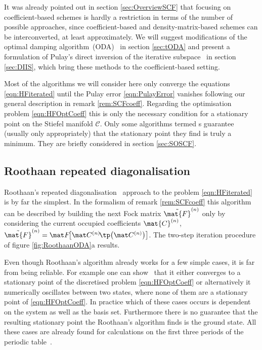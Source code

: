 It was already pointed out in section \vref{sec:OverviewSCF}
that focusing on coefficient-based schemes
is hardly a restriction in terms of the number of possible approaches,
since coefficient-based and density-matrix-based schemes can be interconverted,
at least approximately.
We will suggest modifications of the
optimal damping algorithm~(ODA)~\cite{Cances2000a} in section \ref{sec:tODA}
and present a formulation of Pulay's
direct inversion of the iterative subspace~\cite{Pulay1982}
in section \ref{sec:DIIS},
which bring these methods to the coefficient-based setting.

Most of the \SCF algorithms we will consider here
only converge the \HF equations \eqref{eqn:HFiterated}
until the Pulay error \eqref{eqn:PulayError} vanishes
following our general description in remark \vref{rem:SCFcoeff}.
Regarding the \HF optimisation problem \eqref{eqn:HFOptCoeff}
this is only the necessary condition for a stationary point on the Stiefel
manifold $\mathcal{C}$.
Only some \SCF algorithms
termed s
guarantee (usually only appropriately)
that the stationary point they find is truly a minimum.
They are briefly considered in section \ref{sec:SOSCF}.

\subsection{Roothaan repeated diagonalisation}
\label{sec:RoothaanRepeatedDiag}

Roothaan's repeated diagonalisation~\cite{Roothaan1951}
approach to the \HF problem \eqref{eqn:HFiterated} is by far the simplest.
In the formalism of remark \vref{rem:SCFcoeff}
this algorithm can be described by building the next Fock matrix
$\tilde{\mat{F}}^{(n)}$ only by considering
the current occupied coefficients $\mat{C}^{(n)}$,
\ie $\tilde{\mat{F}}^{(n)} = \matFnfull$.
The two-step iteration procedure of figure \vref{fig:RoothaanODA}a results.

Even though Roothaan's algorithm already works for a few simple cases,
it is far from being reliable.
For example one can show~\cite{Cances2000,Cances2000b} that it
either converges to a stationary point of the
discretised \HF problem \eqref{eqn:HFOptCoeff}
or alternatively it numerically oscillates between two states,
where none of them are a stationary point of \eqref{eqn:HFOptCoeff}.
In practice which of these cases occurs is dependent on the system
as well as the basis set.
Furthermore there is no guarantee that the resulting stationary point
the Roothaan's algorithm finds is the \HF ground state.
All these cases are already found for \HF calculations
on the first three periods of the periodic table~\cite{Cances2000}.

